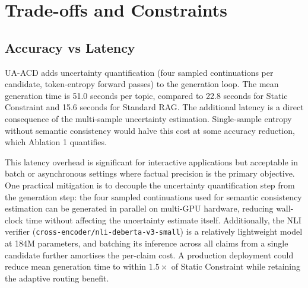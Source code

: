 \documentclass[11pt]{article}
\begin{document}
\section{Trade-offs and Constraints}

\subsection{Accuracy vs Latency}
UA-ACD adds uncertainty quantification (four sampled continuations per candidate, token-entropy forward passes) to the generation loop. The mean generation time is 51.0 seconds per topic, compared to 22.8 seconds for Static Constraint and 15.6 seconds for Standard RAG. The additional latency is a direct consequence of the multi-sample uncertainty estimation. Single-sample entropy without semantic
consistency would halve this cost at some accuracy reduction, which Ablation 1 quantifies.

This latency overhead is significant for interactive applications but acceptable in batch or asynchronous settings where factual precision is the primary objective. One practical mitigation is to decouple the uncertainty quantification step from the generation step: the four sampled continuations used for semantic consistency estimation can be generated in parallel on multi-GPU hardware, reducing wall-clock time without affecting the uncertainty estimate itself. Additionally, the NLI verifier (\texttt{cross-encoder/nli-deberta-v3-small}) is a relatively lightweight model at 184M parameters, and batching its inference across all claims from a single candidate further amortises the per-claim cost. A production deployment could reduce mean generation time to within $1.5\times$ of Static Constraint while retaining the adaptive routing benefit.
\end{document}
